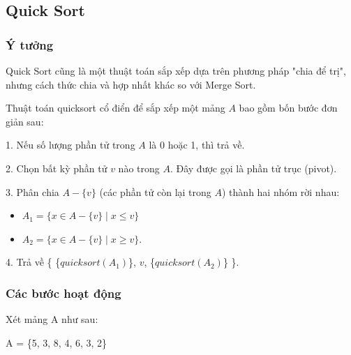 \subsection{Quick Sort}

\subsubsection{Ý tưởng}

Quick Sort cũng là một thuật toán sắp xếp dựa trên phương pháp "chia để trị", nhưng cách thức chia và hợp nhất khác so với Merge Sort.
    

Thuật toán quicksort cổ điển để sắp xếp một mảng $A$ bao gồm bốn bước đơn giản sau:

1. Nếu số lượng phần tử trong $A$ là 0 hoặc 1, thì trả về.

2. Chọn bất kỳ phần tử $v$ nào trong $A$. Đây được gọi là phần tử trục (pivot).

3. Phân chia $A - \{v\}$ (các phần tử còn lại trong $A$) thành hai nhóm rời nhau: 
\begin{itemize}
    \item $A_1 = \{x \in A - \{v\} \mid x \leq v\}$
    \item $A_2 = \{x \in A - \{v\} \mid x \geq v\}$.
\end{itemize}

4. Trả về \{ \{$quicksort(A_1)$\}, $v$, \{$quicksort(A_2)$\} \}.

    
    
\subsubsection{Các bước hoạt động}
Xét mảng A như sau: 
\begin{center}
   A = \{5, 3, 8, 4, 6, 3, 2\} 
\end{center} 

